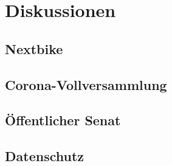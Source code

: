 \section{Diskussionen}

\subsection{Nextbike}


\subsection{Corona-Vollversammlung}


\subsection{Öffentlicher Senat}


\subsection{Datenschutz}